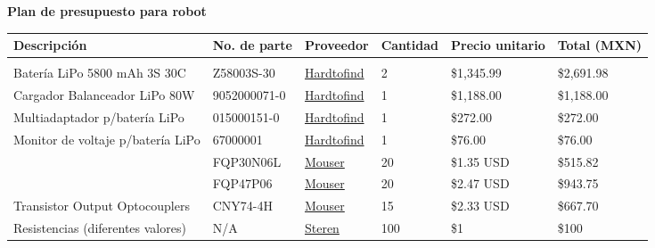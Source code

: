 \documentclass{article}
\begin{document}

\begin{titlingpage}


\begin {table}[H]
\centering
\centering
\hspace{2cm}\hfil{\Huge\bf Plan de presupuesto para robot}
\leftskip-2cm\begin{tabular}{llllll}
    \toprule
    Descripción      &  No. de parte  & Proveedor & Cantidad & Precio unitario & Total (MXN)\\
    \midrule
     \\
    \phantom{ZZ}Batería LiPo 5800 mAh 3S 30C    &   Z58003S-30  &   \href{https://hardtofind.com.mx/?htf=detalle&sku=Z58003S-30&busca=8&tl=Aeroplanos&tb=1&tg=HTF,AEROPLANO}{Hardtofind}  & 2 & \$1,345.99 & \$2,691.98 \\
    \phantom{ZZ}Cargador Balanceador LiPo 80W   &   9052000071-0  &  \href{https://hardtofind.com.mx/?htf=detalle&sku=9052000071-0&busca=26&tl=Simuladores&tb=2&tg=HTF,ACCESORIO,SIMULADOR} {Hardtofind}  & 1 & \$1,188.00 & \$1,188.00 \\
    \phantom{ZZ}Multiadaptador p/batería LiPo    &   015000151-0  &  \href{https://hardtofind.com.mx/?htf=detalle&sku=015000151-0&busca=1&tl=Aeroplanos&tb=1&tg=HTF,AEROPLANO} {Hardtofind}  & 1 & \$272.00 & \$272.00 \\
    \phantom{ZZ}Monitor de voltaje p/batería LiPo     &   67000001  &  \href{https://hardtofind.com.mx/?htf=detalle&sku=067000001&busca=26&tl=Simuladores&tb=2&tg=HTF,ACCESORIO,SIMULADOR} {Hardtofind}  & 1 & \$76.00 & \$76.00 \\
    \phantom{ZZ} & FQP30N06L &  \href{https://bit.ly/2wpkNXm} {Mouser}  & 20 & \$1.35 USD & \$515.82 \\
    \phantom{ZZ} & FQP47P06 &  \href{https://www.mouser.mx/ProductDetail/ON-Semiconductor-Fairchild/FQP47P06?qs=sGAEpiMZZMshyDBzk1\%2fWi1oKJWRB0GXwSn7Vcmu95\%2fU\%3d} {Mouser}  & 20 & \$2.47 USD & \$943.75 \\
    \phantom{ZZ}Transistor Output Optocouplers    &   CNY74-4H  &  \href{https://www.mouser.mx/ProductDetail/Vishay-Semiconductors/CNY74-4H?qs=sGAEpiMZZMteimceiIVCBwfsK9X9U0O6LWmHTDhgJbE\%3d} {Mouser}  & 15 & \$2.33 USD & \$667.70 \\
    \phantom{ZZ}Resistencias (diferentes valores)  &   N/A  &  \href{http://www.steren.com.mx/resistencia-de-carbon-de-1-2-watts-al-5-de-tolerancia.html} {Steren}  & 100 & \$1 & \$100 \\

\end{tabular}
\end{table}
\end{titlingpage}
\end{document}
